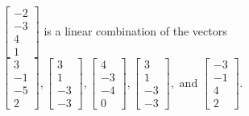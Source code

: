 \begin{exercise}
\begin{exerciseStatement}
  \end{exerciseStatement}
  \begin{exerciseAnswer}
   \(\left[\begin{array}{c}
-2 \\
-3 \\
4 \\
1
\end{array}\right]\) 
  	 is  
	a linear combination of the vectors \(\left[\begin{array}{c}
3 \\
-1 \\
-5 \\
2
\end{array}\right] , \left[\begin{array}{c}
3 \\
1 \\
-3 \\
-3
\end{array}\right] , \left[\begin{array}{c}
4 \\
-3 \\
-4 \\
0
\end{array}\right] , \left[\begin{array}{c}
3 \\
1 \\
-3 \\
-3
\end{array}\right] , \text{ and } \left[\begin{array}{c}
-3 \\
-1 \\
4 \\
2
\end{array}\right]\).

	
  


  \end{exerciseAnswer}
\end{exercise}